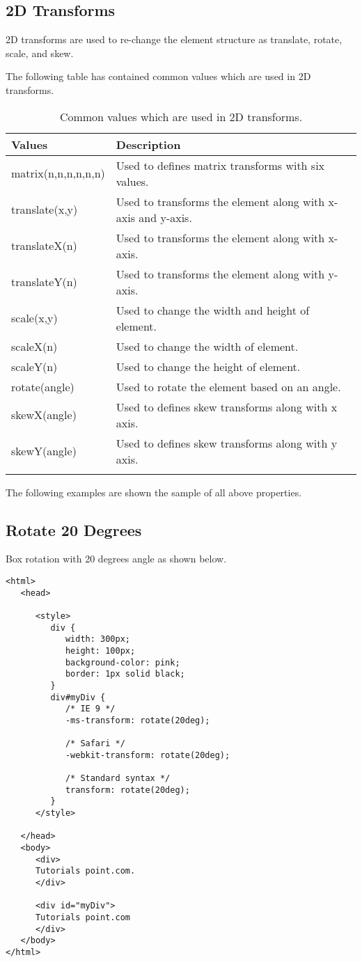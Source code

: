 \documentclass[a4paper,oneside]{book}
\numberwithin{equation}{chapter}
\begin{document}
\subsection{2D Transforms}
2D transforms are used to re-change the element structure as translate, rotate, scale, and skew.

The following table has contained common values which are used in 2D transforms.
\begin{center}
\begin{longtable}{|l|p{8cm}|}
\hline
\textbf{Values} & \textbf{Description}\\
\hline
matrix(n,n,n,n,n,n) & Used to defines matrix transforms with six values.\\
\hline
translate(x,y) & Used to transforms the element along with x-axis and y-axis.\\
\hline
translateX(n) & Used to transforms the element along with x-axis.\\
\hline
translateY(n) & Used to transforms the element along with y-axis.\\
\hline
scale(x,y) & Used to change the width and height of element.\\
\hline
scaleX(n) &	Used to change the width of element.\\
\hline
scaleY(n) & Used to change the height of element.\\
\hline
rotate(angle) & Used to rotate the element based on an angle.\\
\hline
skewX(angle) & Used to defines skew transforms along with x axis.\\
\hline
skewY(angle) & Used to defines skew transforms along with y axis.\\
\hline
\caption{Common values which are used in 2D transforms.}
\end{longtable}
\end{center}
The following examples are shown the sample of all above properties.
\subsection{Rotate 20 Degrees}
Box rotation with 20 degrees angle as shown below.
\begin{verbatim}
<html>
   <head>
   
      <style>
         div {
            width: 300px;
            height: 100px;
            background-color: pink;
            border: 1px solid black;
         }
         div#myDiv {
            /* IE 9 */
            -ms-transform: rotate(20deg);
            
            /* Safari */
            -webkit-transform: rotate(20deg);
            
            /* Standard syntax */
            transform: rotate(20deg);
         }
      </style>
      
   </head>
   <body>
      <div>
      Tutorials point.com.
      </div>
      
      <div id="myDiv">
      Tutorials point.com
      </div>
   </body>
</html>
\end{verbatim}
\end{document}
